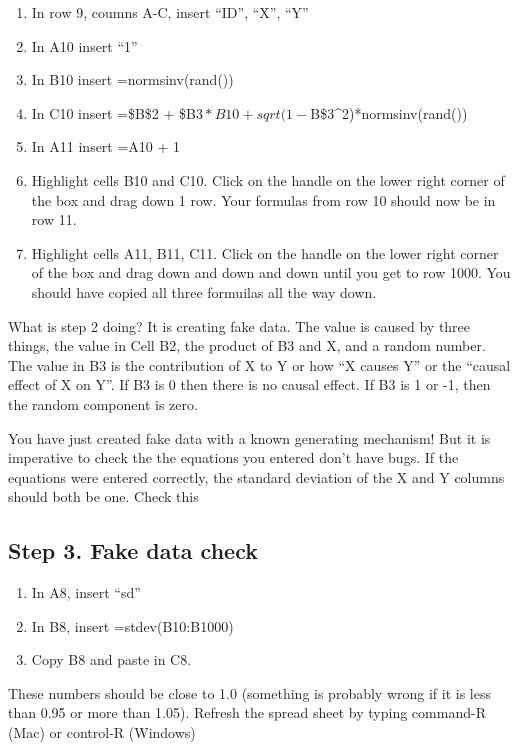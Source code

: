 \documentclass[]{book}
\providecommand{\tightlist}{%
  \setlength{\itemsep}{0pt}\setlength{\parskip}{0pt}}
\begin{document}
\begin{enumerate}
\def\labelenumi{\arabic{enumi}.}
\tightlist
\item
  In row 9, coumns A-C, insert ``ID'', ``X'', ``Y''
\item
  In A10 insert ``1''
\item
  In B10 insert =normsinv(rand())
\item
  In C10 insert =\$B\$2 +
  \$B\(3*B10 + sqrt(1-\)B\$3\^{}2)*normsinv(rand())
\item
  In A11 insert =A10 + 1
\item
  Highlight cells B10 and C10. Click on the handle on the lower right
  corner of the box and drag down 1 row. Your formulas from row 10
  should now be in row 11.
\item
  Highlight cells A11, B11, C11. Click on the handle on the lower right
  corner of the box and drag down and down and down until you get to row
  1000. You should have copied all three formuilas all the way down.
\end{enumerate}

What is step 2 doing? It is creating fake data. The value is caused by
three things, the value in Cell B2, the product of B3 and X, and a
random number. The value in B3 is the contribution of X to Y or how ``X
causes Y'' or the ``causal effect of X on Y''. If B3 is 0 then there is
no causal effect. If B3 is 1 or -1, then the random component is zero.

You have just created fake data with a known generating mechanism! But
it is imperative to check the the equations you entered don't have bugs.
If the equations were entered correctly, the standard deviation of the X
and Y columns should both be one. Check this

\subsection{Step 3. Fake data check}\label{step-3.-fake-data-check}

\begin{enumerate}
\def\labelenumi{\arabic{enumi}.}
\tightlist
\item
  In A8, insert ``sd''
\item
  In B8, insert =stdev(B10:B1000)
\item
  Copy B8 and paste in C8.
\end{enumerate}

These numbers should be close to 1.0 (something is probably wrong if it
is less than 0.95 or more than 1.05). Refresh the spread sheet by typing
command-R (Mac) or control-R (Windows)
\end{document}

